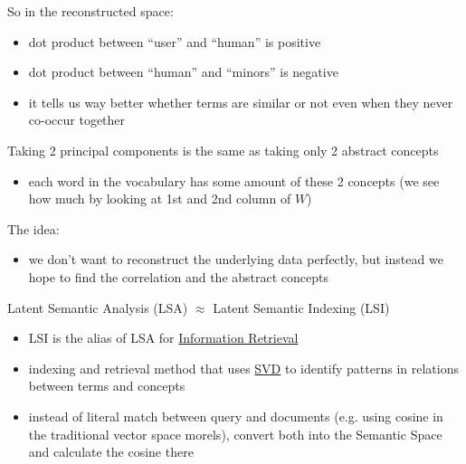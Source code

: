 So in the reconstructed space:

\begin{itemize}
\itemsep1pt\parskip0pt
\item
  dot product between ``user'' and ``human'' is positive
\item
  dot product between ``human'' and ``minors'' is negative
\item
  it tells us way better whether terms are similar or not even when they
  never co-occur together
\end{itemize}

Taking 2 principal components is the same as taking only 2 abstract
concepts

\begin{itemize}
\itemsep1pt\parskip0pt
\item
  each word in the vocabulary has some amount of these 2 concepts (we
  see how much by looking at 1st and 2nd column of $W$)
\end{itemize}

The idea:

\begin{itemize}
\itemsep1pt\parskip0pt
\item
  we don't want to reconstruct the underlying data perfectly, but
  instead we hope to find the correlation and the abstract concepts
\end{itemize}

Latent Semantic Analysis (LSA) $\approx$ Latent
Semantic Indexing (LSI)

\begin{itemize}
\itemsep1pt\parskip0pt
\item
  LSI is the alias of LSA for \href{Information Retrieval}{Information
  Retrieval}
\item
  indexing and retrieval method that uses
  \href{Singular Value Decomposition}{SVD} to identify patterns in
  relations between terms and concepts
\item
  instead of literal match between query and documents (e.g. using
  cosine in the traditional vector space morels), convert both into the
  Semantic Space and calculate the cosine there
\end{itemize}

